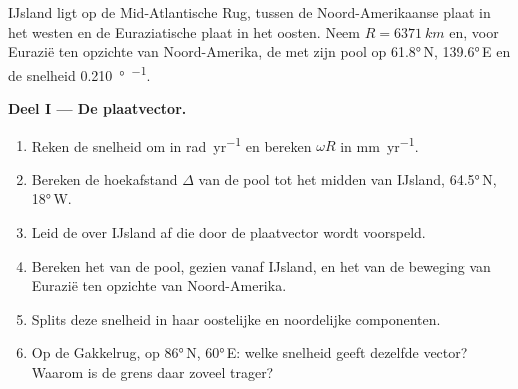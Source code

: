 \begin{problem}
\label{pb:b1:plate-kinematics:1}
IJsland ligt op de Mid-Atlantische Rug, tussen de Noord-Amerikaanse plaat in het westen en de Euraziatische plaat in het oosten. Neem $R = \qty{6371}{km}$ en, voor Eurazië ten opzichte van Noord-Amerika, de  met zijn pool op
\ang{61.8}\,N, \ang{139.6}\,E en de snelheid \qty{0.210}{\degree\per\Myr}.

\medskip
\noindent\textbf{Deel I --- De plaatvector.}
\begin{enumerate}
  \item Reken de snelheid om in \unit{rad.yr^{-1}} en bereken $\omega R$ in \unit{mm.yr^{-1}}.
  \item Bereken de hoekafstand $\Delta$ van de pool tot het midden van IJsland, \ang{64.5}\,N, \ang{18}\,W.
  \item Leid de  over IJsland af die door de plaatvector wordt voorspeld.
  \item Bereken het  van de pool, gezien vanaf IJsland, en het  van de beweging van Eurazië ten opzichte van Noord-Amerika.
  \item Splits deze snelheid in haar oostelijke en noordelijke componenten.
  \item Op de Gakkelrug, op \ang{86}\,N, \ang{60}\,E: welke snelheid geeft dezelfde vector? Waarom is de grens daar zoveel trager?
\end{enumerate}


\end{problem}
